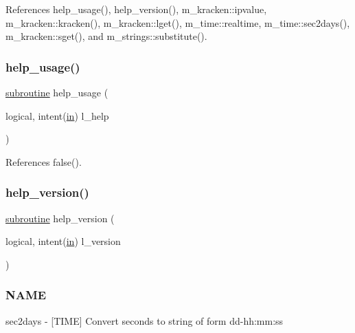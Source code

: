 References help\+\_\+usage(), help\+\_\+version(), m\+\_\+kracken\+::ipvalue, m\+\_\+kracken\+::kracken(), m\+\_\+kracken\+::lget(), m\+\_\+time\+::realtime, m\+\_\+time\+::sec2days(), m\+\_\+kracken\+::sget(), and m\+\_\+strings\+::substitute().

\mbox{\label{sec2days_8f90_a3e09a3b52ee8fb04eeb93fe5761626a8}} 
\subsubsection{\texorpdfstring{help\+\_\+usage()}{help\_usage()}}
{\footnotesize\ttfamily \hyperlink{M__stopwatch_83_8txt_acfbcff50169d691ff02d4a123ed70482}{subroutine} help\+\_\+usage (\begin{DoxyParamCaption}\item[{logical, intent(\hyperlink{M__journal_83_8txt_afce72651d1eed785a2132bee863b2f38}{in})}]{l\+\_\+help }\end{DoxyParamCaption})}



References false().

\mbox{\label{sec2days_8f90_a39c21619b08a3c22f19e2306efd7f766}} 
\subsubsection{\texorpdfstring{help\+\_\+version()}{help\_version()}}
{\footnotesize\ttfamily \hyperlink{M__stopwatch_83_8txt_acfbcff50169d691ff02d4a123ed70482}{subroutine} help\+\_\+version (\begin{DoxyParamCaption}\item[{logical, intent(\hyperlink{M__journal_83_8txt_afce72651d1eed785a2132bee863b2f38}{in})}]{l\+\_\+version }\end{DoxyParamCaption})}



\subsubsection*{N\+A\+ME}

sec2days -\/ \mbox{[}T\+I\+ME\mbox{]} Convert seconds to string of form dd-\/hh\+:mm\+:ss 

